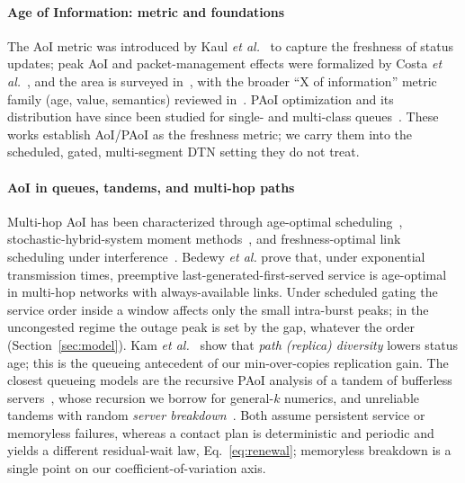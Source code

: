 \documentclass[twocolumn,3p,times,procedia]{elsarticle}
\theoremstyle{plain}
\theoremstyle{remark}
\begin{document}
\paragraph*{Age of Information: metric and foundations}
The AoI metric was introduced by Kaul \emph{et al.}~\cite{kaul2012} to
capture the freshness of status updates; peak AoI and packet-management
effects were formalized by Costa \emph{et al.}~\cite{costa2016}, and the
area is surveyed in~\cite{yates2021survey,kosta2017}, with the broader
``X of information'' metric family (age, value, semantics) reviewed
in~\cite{wu2026xoi}. PAoI optimization and
its distribution have since been studied for single- and multi-class
queues~\cite{huang2015,champati2019}. These works establish AoI/PAoI as the
freshness metric; we carry them into the scheduled, gated, multi-segment
DTN setting they do not treat.

\paragraph*{AoI in queues, tandems, and multi-hop paths}
Multi-hop AoI has been characterized through age-optimal
scheduling~\cite{bedewy2017,bedewy2019}, stochastic-hybrid-system moment
methods~\cite{yates2020}, and freshness-optimal link scheduling under
interference~\cite{talak2018}. Bedewy \emph{et al.} prove that, under
exponential transmission times, preemptive last-generated-first-served
service is age-optimal in multi-hop networks with always-available
links. Under scheduled gating the service order inside a window affects
only the small intra-burst peaks; in the uncongested regime the outage
peak is set by the gap, whatever the order
(Section~\ref{sec:model}). Kam \emph{et al.}~\cite{kam2016} show that
\emph{path (replica) diversity} lowers status age; this is the queueing
antecedent of our min-over-copies replication gain. The closest
queueing models are the recursive PAoI analysis of a tandem of
bufferless servers~\cite{sinha}, whose recursion we borrow for
general-$k$ numerics, and unreliable tandems with random \emph{server
breakdown}~\cite{senthilkumar}. Both assume persistent service or
memoryless failures, whereas a contact plan is deterministic and
periodic and yields a different residual-wait law,
Eq.~\eqref{eq:renewal}; memoryless breakdown is a single point on our
coefficient-of-variation axis.
\end{document}
